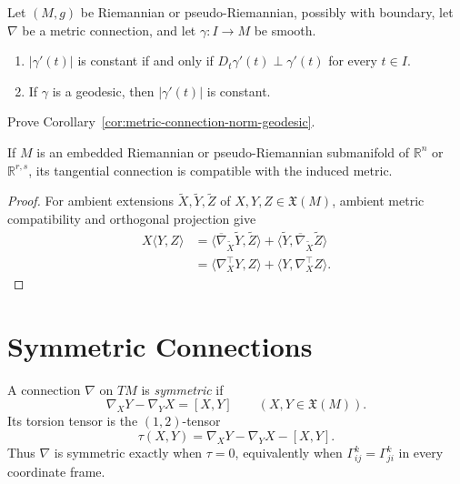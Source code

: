 \begin{corollary}
\label{cor:metric-connection-norm-geodesic}

Let $(M,g)$ be Riemannian or pseudo-Riemannian, possibly with boundary, let
$\nabla$ be a metric connection, and let $\gamma:I\to M$ be smooth.
\begin{enumerate}
\item[(a)] $|\gamma'(t)|$ is constant if and only if
$D_t\gamma'(t)\perp\gamma'(t)$ for every $t\in I$.
\item[(b)] If $\gamma$ is a geodesic, then $|\gamma'(t)|$ is constant.
\end{enumerate}
\end{corollary}

\begin{exercise}
\label{exer:prove-corollary-5-6}

Prove Corollary~\ref{cor:metric-connection-norm-geodesic}.
\end{exercise}

\begin{proposition}
\label{prop:tangential-connection-compatible-metric}

If $M$ is an embedded Riemannian or pseudo-Riemannian submanifold of
$\mathbb R^n$ or $\mathbb R^{r,s}$, its tangential connection is compatible
with the induced metric.

\begin{proof}
\sketch For ambient extensions $\widetilde X,\widetilde Y,\widetilde Z$ of
$X,Y,Z\in\mathfrak X(M)$, ambient metric compatibility and orthogonal
projection give
\begin{align*}
X\langle Y,Z\rangle
&=\langle\overline\nabla_{\widetilde X}\widetilde Y,\widetilde Z\rangle
 +\langle\widetilde Y,\overline\nabla_{\widetilde X}\widetilde Z\rangle\\
&=\langle\nabla_X^\top Y,Z\rangle+\langle Y,\nabla_X^\top Z\rangle.
\end{align*}
\end{proof}
\end{proposition}

\section{Symmetric Connections}

A connection $\nabla$ on $TM$ is \emph{symmetric} if
\[
\nabla_XY-\nabla_YX=[X,Y]
\qquad(X,Y\in\mathfrak X(M)).
\]
Its torsion tensor is the $(1,2)$-tensor
\[
\tau(X,Y)=\nabla_XY-\nabla_YX-[X,Y].
\]
Thus $\nabla$ is symmetric exactly when $\tau=0$, equivalently when
$\Gamma^k_{ij}=\Gamma^k_{ji}$ in every coordinate frame.

